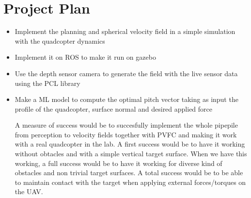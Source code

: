 \section{Project Plan}
\begin{itemize}
    \item Implement the planning and spherical velocity field in a simple simulation with the quadcopter dynamics
    \item Implement it on ROS to make it run on gazebo
    \item Use the depth sensor camera to generate the field with the live sensor data using the PCL library
    \item Make a ML model to compute the optimal pitch vector taking as input the profile of the quadcopter, surface normal and desired applied force

A measure of success would be to succesfully implement the whole pipepile from perception to velocity fields together with PVFC and making it work with a real quadcopter in the lab. A first success would be to have it working without obtacles and with a simple vertical target surface. 
When we have this working, a full success would be to have it working for diverse kind of obstacles and non trivial target surfaces.
A total success would be to be able to maintain contact with the target when applying external forces/torques on the UAV. 
\end{itemize}